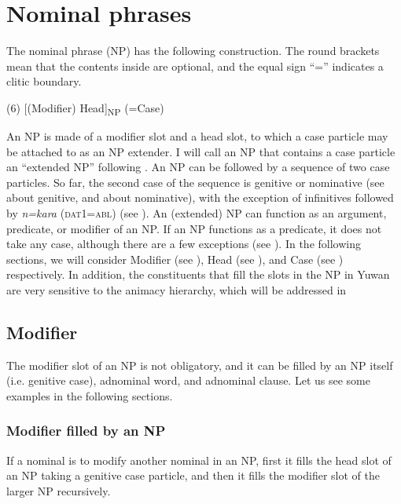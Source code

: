 \chapter{Nominal phrases}\label{chap:6}

The nominal phrase (NP) has the following construction. The round brackets mean that the contents inside are optional, and the equal sign “=” indicates a clitic boundary.

(6) [(Modifier) Head]\textsubscript{NP} (=Case)

An NP is made of a modifier slot and a head slot, to which a case particle may be attached to as an NP extender. I will call an NP that contains a case particle an “extended NP” following \citet[167]{Shimoji2008}. An NP can be followed by a sequence of two case particles. So far, the second case of the sequence is genitive or nominative (see  about genitive, and  about nominative), with the exception of infinitives followed by \textit{n=kara} (\textsc{dat}1=\textsc{abl}) (see ). An (extended) NP can function as an argument, predicate, or modifier of an NP. If an NP functions as a predicate, it does not take any case, although there are a few exceptions (see ). In the following sections, we will consider Modifier (see ), Head (see ), and Case (see ) respectively. In addition, the constituents that fill the slots in the NP in Yuwan are very sensitive to the animacy hierarchy, which will be addressed in 

\section{Modifier}

The modifier slot of an NP is not obligatory, and it can be filled by an NP itself (i.e. genitive case), adnominal word, and adnominal clause. Let us see some examples in the following sections.

\subsection{Modifier filled by an NP}

If a nominal is to modify another nominal in an NP, first it fills the head slot of an NP taking a genitive case particle, and then it fills the modifier slot of the larger NP recursively.


